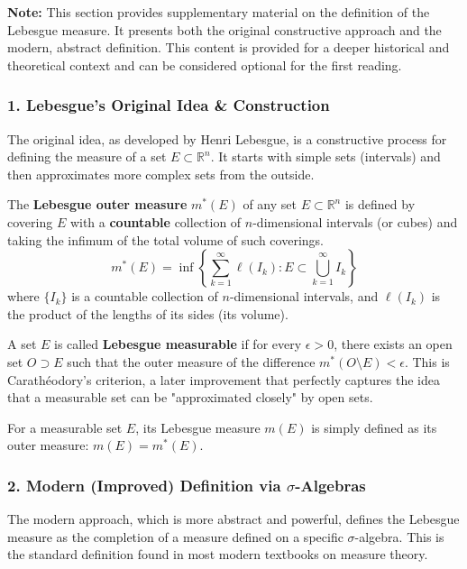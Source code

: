\begin{remark}
\textbf{Note:} This section provides supplementary material on the definition of the Lebesgue measure. It presents both the original constructive approach and the modern, abstract definition. This content is provided for a deeper historical and theoretical context and can be considered optional for the first reading.
\end{remark}

\subsubsection*{1. Lebesgue's Original Idea \& Construction}

The original idea, as developed by Henri Lebesgue, is a constructive process for defining the measure of a set \( E \subset \mathbb{R}^n \). It starts with simple sets (intervals) and then approximates more complex sets from the outside.

\begin{definition}
The \textbf{Lebesgue outer measure} \( m^*(E) \) of any set \( E \subset \mathbb{R}^n \) is defined by covering \( E \) with a \textbf{countable} collection of \( n \)-dimensional intervals (or cubes) and taking the infimum of the total volume of such coverings.
\[
m^*(E) = \inf \left\{ \sum_{k=1}^{\infty} \ell(I_k) : E \subset \bigcup_{k=1}^{\infty} I_k \right\}
\]
where \( \{I_k\} \) is a countable collection of \( n \)-dimensional intervals, and \( \ell(I_k) \) is the product of the lengths of its sides (its volume).

A set \( E \) is called \textbf{Lebesgue measurable} if for every \( \epsilon > 0 \), there exists an open set \( O \supset E \) such that the outer measure of the difference \( m^*(O \setminus E) < \epsilon \). This is Carathéodory's criterion, a later improvement that perfectly captures the idea that a measurable set can be "approximated closely" by open sets.

For a measurable set \( E \), its Lebesgue measure \( m(E) \) is simply defined as its outer measure: \( m(E) = m^*(E) \).
\end{definition}

\subsubsection*{2. Modern (Improved) Definition via \(\sigma\)-Algebras}

The modern approach, which is more abstract and powerful, defines the Lebesgue measure as the completion of a measure defined on a specific \(\sigma\)-algebra. This is the standard definition found in most modern textbooks on measure theory.

